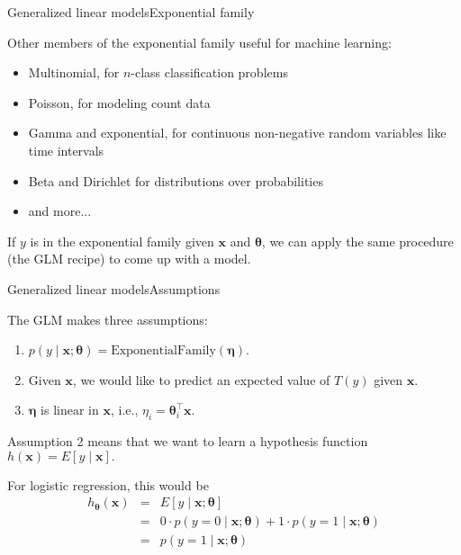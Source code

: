 \documentclass{beamer}
\renewcommand{\vec}[1]{\boldsymbol{#1}}
\begin{document}
\begin{frame}{Generalized linear models}{Exponential family}

  Other members of the exponential family useful for machine learning:
  \begin{itemize}
  \item \alert{Multinomial}, for $n$-class classification problems
  \item \alert{Poisson}, for modeling count data
  \item \alert{Gamma} and \alert{exponential}, for continuous non-negative random variables like time intervals
  \item \alert{Beta} and \alert{Dirichlet} for distributions over probabilities
  \item and more...
  \end{itemize}

  If $y$ is in the exponential family given $\vec{x}$ and
  $\vec{\theta}$, we can apply the same procedure (the GLM recipe) to
  come up with a model.

\end{frame}


\begin{frame}{Generalized linear models}{Assumptions}

  The GLM makes three assumptions:
  \begin{enumerate}
  \item $p(y \mid \vec{x} ; \vec{\theta}) =
    \textrm{ExponentialFamily}(\vec{\eta})$.
  \item Given $\vec{x}$, we would like to predict an expected value
    of $T(y)$ given $\vec{x}$.
  \item $\vec{\eta}$ is linear in $\vec{x}$, i.e., $\eta_i = \vec{\theta}_i^\top \vec{x}$.
  \end{enumerate}

  Assumption 2 means that we want to learn a hypothesis function
  $h(\vec{x}) = E[y\mid \vec{x}].$

  \medskip

  For logistic regression, this would be
  \begin{eqnarray}
    h_{\vec{\theta}}(\vec{x}) & = & E[y \mid \vec{x} ; \vec{\theta} ] \nonumber \\
    & = & 0 \cdot p(y=0 \mid \vec{x}; \vec{\theta}) + 1 \cdot p(y = 1 \mid \vec{x};\vec{\theta}) \nonumber \\
    & = &     p(y=1 \mid \vec{x};\vec{\theta}) \nonumber
  \end{eqnarray}
  
\end{frame}
\end{document}
